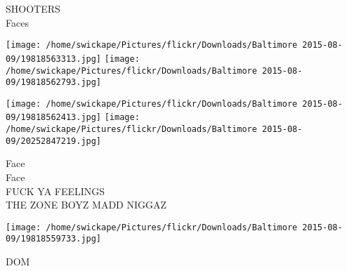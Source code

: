 \documentclass[10pt,letterpaper]{article}
\begin{document}
SHOOTERS\\
Faces\\
\pagebreak

\texttt{[image: /home/swickape/Pictures/flickr/Downloads/Baltimore 2015-08-09/19818563313.jpg]}
\texttt{[image: /home/swickape/Pictures/flickr/Downloads/Baltimore 2015-08-09/19818562793.jpg]}

\texttt{[image: /home/swickape/Pictures/flickr/Downloads/Baltimore 2015-08-09/19818562413.jpg]}
\texttt{[image: /home/swickape/Pictures/flickr/Downloads/Baltimore 2015-08-09/20252847219.jpg]}

Face\\
Face\\
FUCK YA FEELINGS\\
THE ZONE BOYZ MADD NIGGAZ\\
\pagebreak

\texttt{[image: /home/swickape/Pictures/flickr/Downloads/Baltimore 2015-08-09/19818559733.jpg]}

DOM\\
\pagebreak
\end{document}
